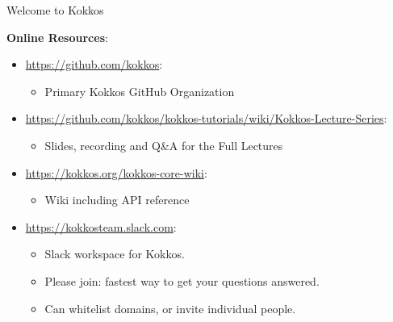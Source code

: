 \begin{frame}{Welcome to Kokkos}

    \textbf{Online Resources}:
    
    \begin{itemize}
            \item \url{https://github.com/kokkos}:
                    \begin{itemize}
                            \item Primary Kokkos GitHub Organization
                    \end{itemize}
            \item \url{https://github.com/kokkos/kokkos-tutorials/wiki/Kokkos-Lecture-Series}:
                    \begin{itemize}
                            \item{Slides, recording and Q\&A for the Full Lectures}
                    \end{itemize}
            \item \url{https://kokkos.org/kokkos-core-wiki}:
                    \begin{itemize}
                           \item Wiki including API reference
                    \end{itemize}
            \item \url{https://kokkosteam.slack.com}:
                    \begin{itemize}
                            \item Slack workspace for Kokkos.
                            \item Please join: fastest way to get your questions answered.
                            \item Can whitelist domains, or invite individual people.
                    \end{itemize}
    \end{itemize}
    
\end{frame}

